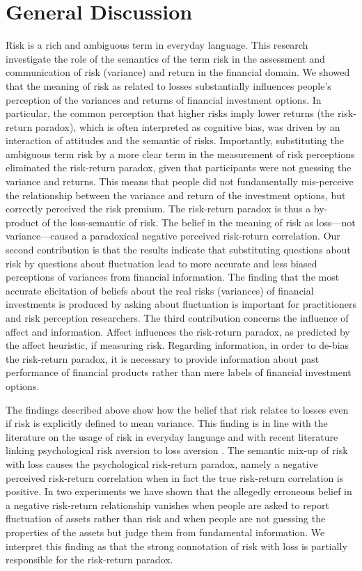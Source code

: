 \documentclass[a4paper,man, natbib,floatsintext]{apa6} %
\begin{document}
\section{General Discussion}
Risk is a rich and ambiguous term in everyday language. This research investigate the role of the semantics of the term risk in the assessment and communication of risk (variance) and return in the financial domain. We showed that the meaning of risk as related to losses substantially influences people's perception of the variances and returns of financial investment options. In particular, the common perception that higher risks imply lower returns (the risk-return paradox), which is often interpreted as cognitive bias, was driven by an interaction of attitudes and the semantic of risks. Importantly, substituting the ambiguous term risk by a more clear term in the measurement of risk perceptions eliminated the risk-return paradox, given that participants were not guessing the variance and returns. This means that people did not fundamentally mis-perceive the relationship between the variance and return of the investment options, but correctly perceived the risk premium. The risk-return paradox is thus a by-product of the loss-semantic of risk. The belief in the meaning of risk as loss---not variance---caused a paradoxical negative perceived risk-return correlation. Our second contribution is that the results indicate that substituting questions about risk by questions about fluctuation lead to more accurate and less biased perceptions of variances from financial information. The finding that the most accurate elicitation of beliefs about the real risks (variances) of financial investments is produced by asking about fluctuation is important for practitioners and risk perception researchers. The third contribution concerns the influence of affect and information. Affect influences the risk-return paradox, as predicted by the affect heuristic, if measuring risk. Regarding information, in order to de-bias the risk-return paradox, it is necessary to provide information about past performance of financial products rather than mere labels of financial investment options.

The findings described above show how the belief that risk relates to losses even if risk is explicitly defined to mean variance. This finding is in line with the literature on the usage of risk in everyday language \citep{Boholm2016} and with recent literature linking psychological risk aversion to loss aversion \citep{Duxbury2004}. The semantic mix-up of risk with loss causes the psychological risk-return paradox, namely a negative perceived risk-return correlation when in fact the true risk-return correlation is positive. In two experiments we have shown that the allegedly erroneous belief in a negative risk-return relationship vanishes when people are asked to report fluctuation of assets rather than risk and when people are not guessing the properties of the assets but judge them from fundamental information. We interpret this finding as that the strong connotation of risk with loss is partially responsible for the risk-return paradox. 
\end{document}
